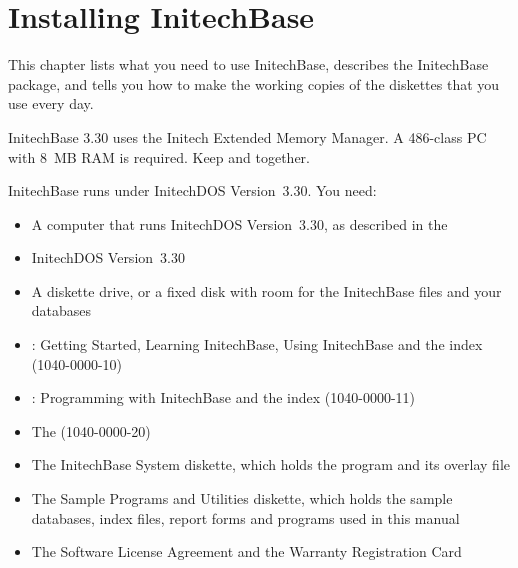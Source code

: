 \chapter{Installing InitechBase}
This chapter lists what you need to use InitechBase, describes the InitechBase
package, and tells you how to make the working copies of the diskettes that
you use every day.

InitechBase 3.30 uses the Initech Extended Memory Manager. A 486-class PC
with 8~MB RAM is required. Keep  and  together.

InitechBase runs under InitechDOS Version~3.30.  You need:
\begin{itemize}
\item A computer that runs InitechDOS Version~3.30, as described in the
\item InitechDOS Version~3.30
\item A diskette drive, or a fixed disk with room for the InitechBase files and
  your databases
\end{itemize}

\begin{itemize}
\item {}: Getting Started, Learning InitechBase,
  Using InitechBase and the index (1040-0000-10)
\item {}: Programming with InitechBase and the
  index (1040-0000-11)
\item The  (1040-0000-20)
\item The InitechBase System diskette, which holds the program
   and its overlay file 
\item The Sample Programs and Utilities diskette, which holds the sample
  databases, index files, report forms and programs used in this manual
\item The Software License Agreement and the Warranty Registration Card
\end{itemize}

